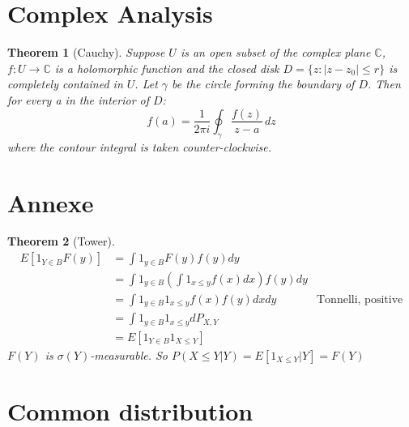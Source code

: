 \documentclass{article}
\newtheorem{theorem}{Theorem}
\begin{document}
\section{Complex Analysis}


\begin{theorem}[Cauchy]
  Suppose $U$ is an open subset of the complex plane $\mathbb C$,
  $f : U \rightarrow \mathbb C$ is a holomorphic function and the
  closed disk $D = \{ z: |z-z_0| \le r\}$ is completely contained
  in $U$. Let $\gamma$ be the circle forming the boundary of $D$. Then
  for every a in the interior of $D$:
$$f(a) = \frac{1}{2\pi i} \oint_\gamma \frac{f(z)}{z-a}\, dz $$
where the contour integral is taken counter-clockwise.
\end{theorem}

\section{Annexe}
\begin{theorem}[Tower]
\begin{align*}
  E[1_{Y \in B} F(y)] &= \int 1_{y \in B} F(y) f(y) dy\\
                      &= \int 1_{y \in B} (\int 1_{x \le y} f(x)dx) f(y) dy\\
                      &= \int 1_{y \in B}  1_{x \le y} f(x) f(y) dx dy & \text{Tonnelli, positive}\\
                      &= \int 1_{y \in B}  1_{x \le y} dP_{X,Y}\\
                      &= E[1_{Y \in B} 1_{X \le Y}]
\end{align*}
$F(Y)$ is $\sigma(Y)$-measurable.  So
$P(X \le Y | Y ) = E[1_{X \le Y} | Y] = F(Y)$
\end{theorem}

\section{Common distribution}
\end{document}
